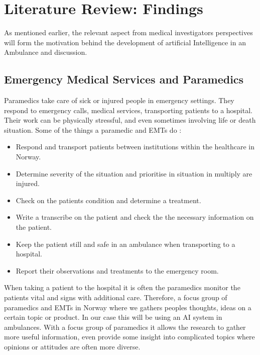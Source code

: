 \documentclass[fleqn,10pt]{wlscirep}
\begin{document}
\section{Literature Review: Findings }

As mentioned earlier, the relevant aspect from medical investigators perspectives will form the motivation behind the development of artificial Intelligence in an Ambulance and discussion.

\subsection{Emergency Medical Services and Paramedics}
Paramedics take care of sick or injured people in emergency settings. They respond to emergency calls, medical services, transporting patients to a hospital. Their work can be physically stressful, and even sometimes involving life or death situation. Some of the things a paramedic and EMTs do : 

\begin{itemize}
\item Respond and transport patients between institutions within the healthcare in Norway. 
\item Determine severity of the situation and prioritise in situation in multiply are injured. 
\item Check on the patients condition and determine a treatment. 
\item Write a transcribe  on the patient and check the the necessary information on the patient. 
\item Keep the patient still and safe in an ambulance when transporting to a hospital. 
\item Report their observations and treatments to the emergency room. 
\end{itemize}
When taking a patient to the hospital it is often the paramedics monitor the patients vital and signs with additional care. Therefore, a focus group of paramedics and EMTs in Norway where we gathers peoples thoughts, ideas on a certain topic or product. In our case this will be using an AI system in ambulances. With a focus group of paramedics it allows the research to gather more useful information, even provide some insight into complicated topics where opinions or attitudes are often more diverse. 
\end{document}
